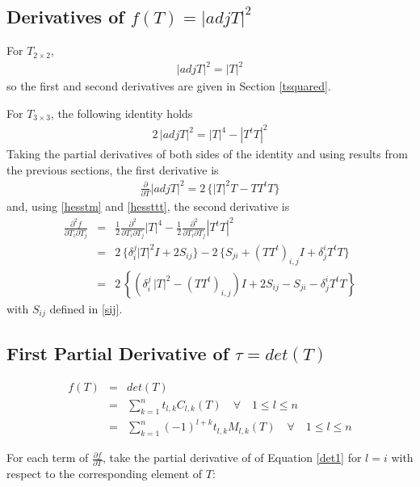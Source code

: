 \documentclass{report}
\begin{document}
\subsection{Derivatives of $f(T)=|adj T|^2$ \label{nrm-adj}}
For $T_{2 \times 2}$, 
\begin{eqnarray}
|adj T|^2 = |T|^2 
\end{eqnarray}
so the first and second derivatives are given in Section \ref{tsquared}. \newline

\noindent For $T_{3 \times 3}$, the following identity holds
\begin{eqnarray}
2 \, |adj T|^2 = |T|^4 - |T^t T|^2
\end{eqnarray}
Taking the partial derivatives of both sides of the identity and using results 
from the previous sections, the first derivative is
\begin{eqnarray}
\frac{\partial}{\partial T} |adj T|^2 = 2 \, \{ |T|^2 T - T T^t T \}
\end{eqnarray}
and, using \ref{hesstm} and \ref{hessttt}, the second derivative is
\begin{eqnarray}
\frac{\partial^2 f}{\partial T_i \partial T_j} & = & \frac{1}{2} \frac{\partial^2 }{\partial T_i \partial T_j} |T|^4 - \frac{1}{2} \frac{\partial^2}{\partial T_i \partial T_j} |T^t T|^2 \nonumber \\
 & = & 2 \, \{ \delta_i^j |T|^2 I + 2 S_{ij} \} - 2 \, \{ S_{ji} + (T T^t)_{i,j} I + \delta_j^i T^t T \} \nonumber \\
 & = & 2 \, \left\{ \left( \delta_i^j \, |T|^2 - (T T^t)_{i,j} \right) I + 2 S_{ij}-S_{ji} - \delta_j^i T^t T \right\} \label{hess-nrm-adj}
\end{eqnarray}
with $S_{ij}$ defined in \ref{sij}. \newline

\subsection{First Partial Derivative of $\tau=det(T)$ \label{tau}}

\begin{eqnarray}
f(T) &=& det(T) \\
     &=& \sum_{k=1}^n t_{l,k} C_{l,k}(T) \quad \forall \quad 1 \le l \le n \\
\label{det1}
     &=& \sum_{k=1}^n (-1)^{l+k} t_{l,k} M_{l,k}(T) \quad \forall \quad 1 \le l \le n
\end{eqnarray}

\noindent For each term of $\frac{\partial f}{\partial T}$, take the partial derivative of of Equation \ref{det1} for $l = i$ with respect to the corresponding element of $T$:
\end{document}
